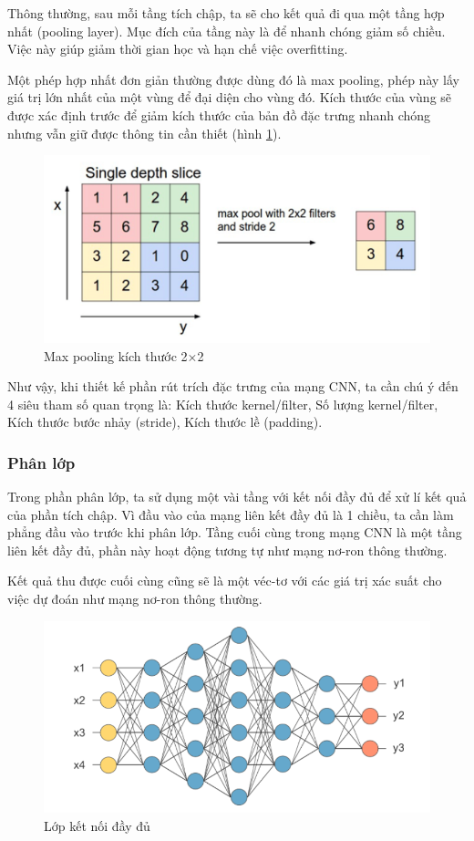 Thông thường, sau mỗi tầng tích chập, ta sẽ cho kết quả đi qua một tầng hợp nhất (pooling layer). Mục đích của tầng này là để nhanh chóng giảm số chiều. Việc này giúp giảm thời gian học và hạn chế việc overfitting. 

Một phép hợp nhất đơn giản thường được dùng đó là max pooling, phép này lấy giá trị lớn nhất của một vùng để đại diện cho vùng đó. Kích thước của vùng sẽ được xác định trước để giảm kích thước của bản đồ đặc trưng nhanh chóng nhưng vẫn giữ được thông tin cần thiết (hình \ref{fig:maxpooling22}).

\begin{figure}[H]
	\centering
	\includegraphics[width=0.8\linewidth]{images/maxpooling22.png}
	\caption{Max pooling kích thước 2×2}
	\label{fig:maxpooling22}
\end{figure}

Như vậy, khi thiết kế phần rút trích đặc trưng của mạng CNN, ta cần chú ý đến 4 siêu tham số quan trọng là: Kích thước kernel/filter, Số lượng kernel/filter, Kích thước bước nhảy (stride), Kích thước lề (padding).

\subsubsection{Phân lớp}
Trong phần phân lớp, ta sử dụng một vài tầng với kết nối đầy đủ để xử lí kết quả của phần tích chập. Vì đầu vào của mạng liên kết đầy đủ là 1 chiều, ta cần làm phẳng đầu vào trước khi phân lớp. Tầng cuối cùng trong mạng CNN là một tầng liên kết đầy đủ, phần này hoạt động tương tự như mạng nơ-ron thông thường.

Kết quả thu được cuối cùng cũng sẽ là một véc-tơ với các giá trị xác suất cho việc dự đoán như mạng nơ-ron thông thường.

\begin{figure}[H]
	\centering
	\includegraphics[width=0.8\linewidth]{images/fullyconnected.png}
	\caption{Lớp kết nối đầy đủ}
\end{figure}

